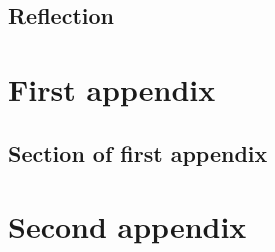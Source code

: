 \documentclass{mproj}
\begin{document}
\section{Reflection}








\appendix %
\chapter{First appendix}
\label{app: firstapp}

\section{Section of first appendix}

\chapter{Second appendix}




\nocite{*}
\end{document}
